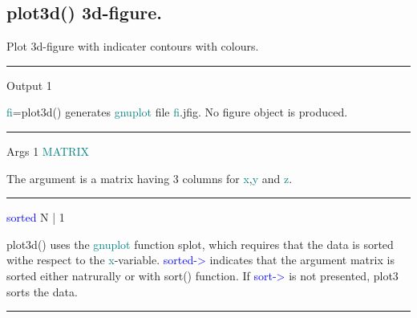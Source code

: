 \subsection{\textcolor{VioletRed}{plot3d}() 3d-figure.} 
\label{plot3d} 
Plot 3d-figure with indicater contours  with colours. 
\vspace{0.3cm} 
\hrule 
\vspace{0.3cm} 
\noindent Output  \tabto{3cm}  1   \tabto{5cm}    \tabto{7cm} 
\begin{changemargin}{3cm}{0cm} 
\noindent  \textcolor{teal}{fi}=\textcolor{VioletRed}{plot3d}() generates \textcolor{teal}{gnuplot} file \textcolor{teal}{fi}.jfig. 
No figure object is produced. 
\end{changemargin} 
\vspace{0.3cm} 
\hrule 
\vspace{0.3cm} 
\noindent Args \tabto{3cm}  1  \tabto{5cm}   \textcolor{teal}{MATRIX}  \tabto{7cm} 
\begin{changemargin}{3cm}{0cm} 
\noindent  The argument is a matrix having 3 columns for \textcolor{teal}{x},\textcolor{teal}{y} and \textcolor{teal}{z}. 
\end{changemargin} 
\vspace{0.3cm} 
\hrule 
\vspace{0.3cm} 
\noindent \textcolor{blue}{sorted}  \tabto{3cm}  N | 1  \tabto{5cm}    \tabto{7cm} 
\begin{changemargin}{3cm}{0cm} 
\noindent \textcolor{VioletRed}{plot3d}() uses the \textcolor{teal}{gnuplot} function splot, which requires that the data 
is sorted withe respect to the \textcolor{teal}{x}-variable. \textcolor{blue}{sorted->} indicates that the argument matrix is sorted 
either natrurally or with \textcolor{VioletRed}{sort}() function. If \textcolor{blue}{sort->} is not presented, plot3 
sorts the data. 
\end {changemargin} 
\hrule 
\vspace{0.2cm} 
\singlespacing 
